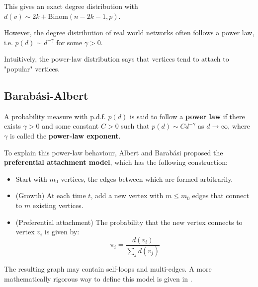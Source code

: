 \documentclass{article}
\begin{document}
This gives an exact degree distribution with $d(v) \sim 2k+\mathrm{Binom}(n-2k-1, p)$.

However, the degree distribution of real world networks often follows a power law, i.e. $p(d)\sim d^{-\gamma}$ for some $\gamma>0$.  

\begin{remark}
    Intuitively, the power-law distribution says that vertices tend to attach to "popular" vertices.
\end{remark}

\subsection{Barab\'{a}si-Albert}  

\begin{definition}
    A probability measure with p.d.f. $p(d)$ is said to follow a \textbf{power law} if there exists $\gamma>0$ and some constant $C>0$ such that $p(d)\sim C d^{-\gamma}$ as $d\to \infty$, where $\gamma$ is called the \textbf{power-law exponent}.
\end{definition}

To explain this power-law behaviour, Albert and Barab\'{a}si proposed the \textbf{preferential attachment model}, which has the following construction:
\begin{itemize}
    \item Start with $m_0$ vertices, the edges between which are formed arbitrarily.  
    \item (Growth) At each time $t$, add a new vertex with $m\leq m_0$ edges that connect to $m$ existing vertices.
    \item (Preferential attachment) The probability that the new vertex connects to vertex $v_i$ is given by:
    \begin{equation*}
        \pi_i = \frac{d(v_i)}{\sum_j d(v_j)}
    \end{equation*}
\end{itemize}

The resulting graph may contain self-loops and multi-edges. A more mathematically rigorous way to define this model is given in \citep{barabasi2016network}.  
\end{document}
